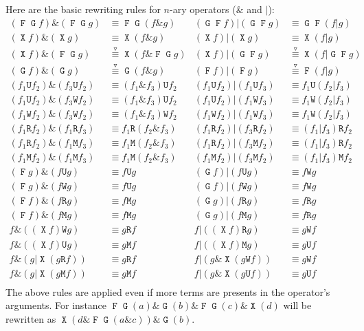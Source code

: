 \documentclass[a4paper,twoside,10pt,DIV=12]{scrreprt}
\DeclareMathOperator{\F}{\texttt{F}}
\DeclareMathOperator{\G}{\texttt{G}}
\newcommand{\U}{\mathbin{\texttt{U}}}
\newcommand{\R}{\mathbin{\texttt{R}}}
\DeclareMathOperator{\X}{\texttt{X}}
\newcommand{\M}{\mathbin{\texttt{M}}}
\newcommand{\W}{\mathbin{\texttt{W}}}
\newcommand{\OR}{\mathbin{\texttt{|}}}
\newcommand{\AND}{\mathbin{\texttt{\&}}}
\newcommand{\0}{\texttt{0}}
\newcommand{\1}{\texttt{1}}
\newcommand{\equivNeu}{\stackrel{\smalltriangledown}{\equiv}}
\begin{document}
Here are the basic rewriting rules for $n$-ary operators ($\AND$ and
$\OR$):
\begin{align*}
  (\F\G f) \AND(\F\G g) &\equiv \F\G(f\AND g)     &
  (\G\F f) \OR (\G\F g) &\equiv \G\F(f\OR g)      \\
  (\X f) \AND(\X g)     &\equiv \X(f\AND g)       &
  (\X f) \OR (\X g)     &\equiv \X(f\OR g)        \\
  (\X f) \AND(\F\G g)   &\equivNeu \X(f\AND \F\G g)  &
  (\X f) \OR (\G\F g)   &\equivNeu \X(f\OR \G\F g)  \\
  (\G f) \AND(\G g)     &\equivNeu \G(f\AND g)       &
  (\F f) \OR (\F g)     &\equivNeu \F(f\OR g)        \\
  (f_1 \U f_2)\AND (f_3 \U f_2)&\equiv (f_1\AND f_3)\U f_2&
  (f_1 \U f_2)\OR  (f_1 \U f_3)&\equiv f_1\U (f_2\OR f_3) \\
  (f_1 \U f_2)\AND (f_3 \W f_2)&\equiv (f_1\AND f_3)\U f_2&
  (f_1 \U f_2)\OR  (f_1 \W f_3)&\equiv f_1\W (f_2\OR f_3) \\
  (f_1 \W f_2)\AND (f_3 \W f_2)&\equiv (f_1\AND f_3)\W f_2&
  (f_1 \W f_2)\OR  (f_1 \W f_3)&\equiv f_1\W (f_2\OR f_3) \\
  (f_1 \R f_2)\AND (f_1 \R f_3)&\equiv f_1\R (f_2\AND f_3)&
  (f_1 \R f_2)\OR  (f_3 \R f_2)&\equiv (f_1\OR f_3) \R f_2\\
  (f_1 \R f_2)\AND (f_1 \M f_3)&\equiv f_1\M (f_2\AND f_3)&
  (f_1 \R f_2)\OR  (f_3 \M f_2)&\equiv (f_1\OR f_3) \R f_2\\
  (f_1 \M f_2)\AND (f_1 \M f_3)&\equiv f_1\M (f_2\AND f_3)&
  (f_1 \M f_2)\OR  (f_3 \M f_2)&\equiv (f_1\OR f_3) \M f_2\\
  (\F g)\AND (f \U g)&\equiv f\U g &
  (\G f)\OR  (f \U g)&\equiv f\W g \\
  (\F g)\AND (f \W g)&\equiv f\U g &
  (\G f)\OR  (f \W g)&\equiv f\W g \\
  (\F f)\AND (f \R g)&\equiv f\M g &
  (\G g)\OR  (f \R g)&\equiv f\R g \\
  (\F f)\AND (f \M g)&\equiv f\M g &
  (\G g)\OR  (f \M g)&\equiv f\R g \\
  f \AND ((\X f) \W g) &\equiv g \R f &
  f \OR ((\X f) \R g) &\equiv g \W f \\
  f \AND ((\X f) \U g) &\equiv g \M f &
  f \OR ((\X f) \M g) &\equiv g \U f \\
  f \AND (g \OR \X(g \R f)) &\equiv g \R f &
  f \OR (g \AND \X(g \W f)) &\equiv g \W f \\
  f \AND (g \OR \X(g \M f)) &\equiv g \M f &
  f \OR (g \AND \X(g \U f)) &\equiv g \U f \\
\end{align*}
The above rules are applied even if more terms are presents in the
operator's arguments.  For instance $\F\G(a)\AND \G(b) \AND \F\G(c) \AND
\X(d)$ will be rewritten as $\X(d \AND \F\G(a\AND c))\AND \G(b)$.
\end{document}
